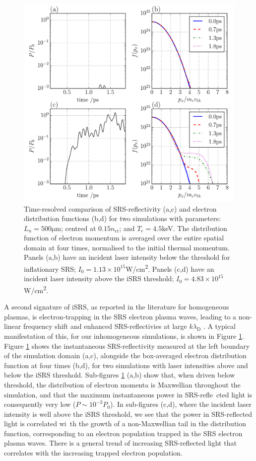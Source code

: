 \begin{figure}[!ht]
 \centering
 \includegraphics[width=0.7\columnwidth]{Chapters/C4_iSRS/fig3_3a_3b_3c_3d.pdf}
 \caption{Time-resolved comparison of SRS-reflectivity (a,c) and electron distribution 
 functions (b,d) for two simulations with parameters: $L_n = 500 \si{\micro\metre} $; centred
 at $0.15n_\mathrm{cr}$; and $T_e = 4.5$\si{\kilo\electronvolt}. The distribution function of
 electron momentum is averaged over the entire spatial domain at four times, normalised to the initial thermal momentum. Panels (a,b) have an incident laser intensity below the threshold for inflationary SRS; $I_0 = 1.13\times10^{15}$\si{W/\centi\metre^2}. Panels (c,d) have an incident laser intensity above the iSRS threshold; $I_0 = 4.83\times10^{15}$\si{W/\centi\metre^2}.}
 \label{fig:reflAndDist}
\end{figure}

A second signature of iSRS, as reported in the literature for homogeneous plasmas, is electron-trapping in the SRS electron plasma waves, leading to a
non-linear frequency shift and enhanced SRS-reflectivies at large $k\lambda_\mathrm{D}$ \cite{Vu2002}.
A typical manifestation of this, for our inhomogeneous simulations, is shown in Figure \ref{fig:reflAndDist}. Figure \ref{fig:reflAndDist}
shows the instantaneous SRS-reflectivity measured at the left boundary of the simulation domain (a,c), alongside the box-averaged electron
distribution function at four times (b,d), for two simulations with laser intensities above and below the iSRS threshold.
Sub-figures \ref{fig:reflAndDist} (a,b) show that, when driven below threshold, the distribution of electron momenta is Maxwellian throughout the simulation, and that the maximum instantaneous power in SRS-refle\
cted light is consequently very low ($P \sim 10^{-3}P_0$). In sub-figures (c,d), where the incident laser intensity is well above the iSRS threshold, we see that the power in SRS-reflected light is correlated wi\
th the growth of a non-Maxwellian tail in the distribution function, corresponding to an electron population trapped in the SRS electron plasma waves.
There is a general trend of increasing SRS-reflected light that correlates with
the increasing trapped electron population.


